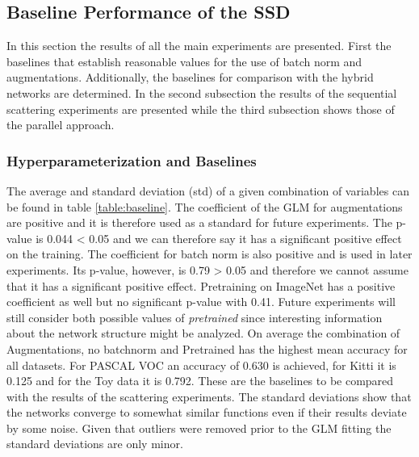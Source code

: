 \subsection{Baseline Performance of the SSD}
\label{subsec:baseline_SSD_results}

In this section the results of all the main experiments are presented. First the baselines that establish reasonable values for the use of batch norm and augmentations. Additionally, the baselines for comparison with the hybrid networks are determined. In the second subsection the results of the sequential scattering experiments are presented while the third subsection shows those of the parallel approach.

\subsubsection{Hyperparameterization and Baselines}

The average and standard deviation (std) of a given combination of variables can be found in table \ref{table:baseline}. The coefficient of the GLM for augmentations are positive and it is therefore used as a standard for future experiments. The p-value is 0.044 < 0.05 and we can therefore say it has a significant positive effect on the training. The coefficient for batch norm is also positive and is used in later experiments. Its p-value, however, is 0.79 > 0.05 and therefore we cannot assume that it has a significant positive effect. Pretraining on ImageNet has a positive coefficient as well but no significant p-value with 0.41. Future experiments will still consider both possible values of \textit{pretrained} since interesting information about the network structure might be analyzed. On average the combination of Augmentations, no batchnorm and Pretrained has the highest mean accuracy for all datasets. For PASCAL VOC an accuracy of 0.630 is achieved, for Kitti it is 0.125 and for the Toy data it is 0.792. These are the baselines to be compared with the results of the scattering experiments. The standard deviations show that the networks converge to somewhat similar functions even if their results deviate by some noise. Given that outliers were removed prior to the GLM fitting the standard deviations are only minor. 

